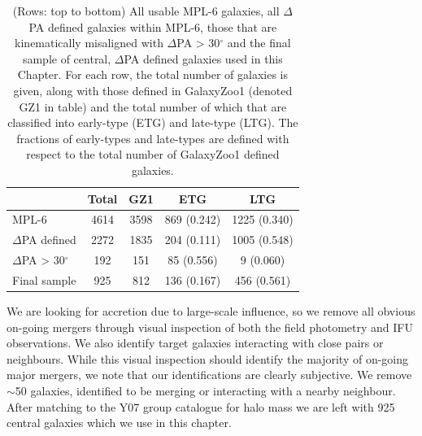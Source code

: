 
\begin{table}
\centering
\begin{tabular}{|l|c|c|c|c|}
\hline
& Total & GZ1 & ETG & LTG \\ \hline
MPL-6 & 4614 & 3598 & 869 (0.242) & 1225 (0.340) \\
$\Delta$PA defined & 2272 & 1835 & 204 (0.111) & 1005 (0.548) \\
$\Delta$PA > 30$^{\circ}$ & 192 & 151 & 85 (0.556) & 9 (0.060)\\
Final sample & 925 & 812 & 136 (0.167) & 456 (0.561) \\ \hline
\end{tabular}
\caption{(Rows: top to bottom) All usable MPL-6 galaxies, all $\Delta$PA defined galaxies within MPL-6, those that are kinematically misaligned with $\Delta$PA > 30$^{\circ}$ and the final sample of central, $\Delta$PA defined galaxies used in this Chapter. For each row, the total number of galaxies is given, along with those defined in GalaxyZoo1 (denoted GZ1 in table) and the total number of which that are classified into early-type (ETG) and late-type (LTG). The fractions of early-types and late-types are defined with respect to the total number of GalaxyZoo1 defined galaxies.}
\label{tab:GZ}
\end{table}

We are looking for accretion due to large-scale influence, so we remove all obvious on-going mergers through visual inspection of both the field photometry and IFU observations. We also identify target galaxies interacting with close pairs or neighbours. While this visual inspection should identify the majority of on-going major mergers, we note that our identifications are clearly subjective. We remove $\sim$50 galaxies, identified to be merging or interacting with a nearby neighbour. After matching to the Y07 group catalogue for halo mass we are left with 925 central galaxies which we use in this chapter. 

